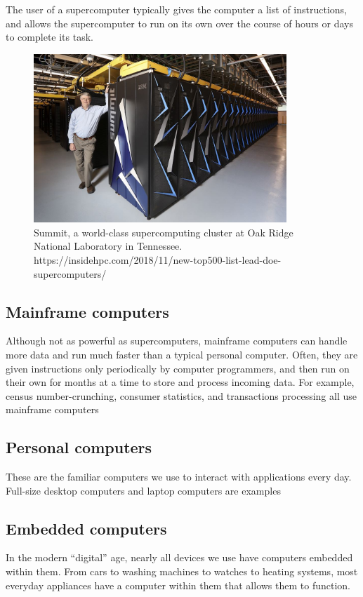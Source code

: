 The user of a supercomputer typically gives the computer a list of instructions, and allows the supercomputer to run on its own over the course of hours or days to complete its task.

\begin{figure}
	\centering
	\includegraphics[width=0.85\textwidth]{images/supercomputer.jpg}
	\caption{Summit, a world-class supercomputing cluster at Oak Ridge National Laboratory in Tennessee. https://insidehpc.com/2018/11/new-top500-list-lead-doe-supercomputers/}
	\label{fig:supercomputer}
\end{figure}

\subsection{Mainframe computers}
Although not as powerful as supercomputers, mainframe computers can handle more data and run much faster than a typical personal computer. Often, they are given instructions only periodically by computer programmers, and then run on their own for months at a time to store and process incoming data. For example, census number-crunching, consumer statistics, and transactions processing all use mainframe computers

\subsection{Personal computers}
These are the familiar computers we use to interact with applications every day. Full-size desktop computers and laptop computers are examples

\subsection{Embedded computers}
In the modern ``digital'' age, nearly all devices we use have computers embedded within them. From cars to washing machines to watches to heating systems, most everyday appliances have a computer within them that allows them to function.

